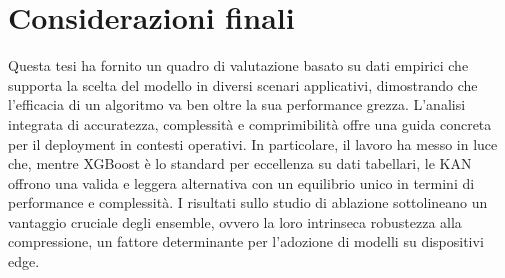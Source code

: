 \documentclass[a4paper,12pt]{report}
\begin{document}
	\section*{Considerazioni finali}
	Questa tesi ha fornito un quadro di valutazione basato su dati empirici che supporta la scelta del modello in diversi scenari applicativi, dimostrando che l'efficacia di un algoritmo va ben oltre la sua performance grezza. L'analisi integrata di accuratezza, complessità e comprimibilità offre una guida concreta per il deployment in contesti operativi. In particolare, il lavoro ha messo in luce che, mentre XGBoost è lo standard per eccellenza su dati tabellari, le KAN offrono una valida e leggera alternativa con un equilibrio unico in termini di performance e complessità. I risultati sullo studio di ablazione sottolineano un vantaggio cruciale degli ensemble, ovvero la loro intrinseca robustezza alla compressione, un fattore determinante per l'adozione di modelli su dispositivi edge.
	
\end{document}
